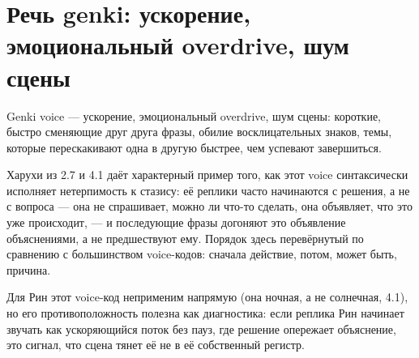 \section{Речь genki: ускорение, эмоциональный overdrive, шум сцены}

Genki voice — ускорение, эмоциональный overdrive, шум сцены: короткие, быстро сменяющие друг друга фразы, обилие восклицательных знаков, темы, которые перескакивают одна в другую быстрее, чем успевают завершиться.

Харухи из 2.7 и 4.1 даёт характерный пример того, как этот voice синтаксически исполняет нетерпимость к стазису: её реплики часто начинаются с решения, а не с вопроса — она не спрашивает, можно ли что-то сделать, она объявляет, что это уже происходит, — и последующие фразы догоняют это объявление объяснениями, а не предшествуют ему. Порядок здесь перевёрнутый по сравнению с большинством voice-кодов: сначала действие, потом, может быть, причина.

Для Рин этот voice-код неприменим напрямую (она ночная, а не солнечная, 4.1), но его противоположность полезна как диагностика: если реплика Рин начинает звучать как ускоряющийся поток без пауз, где решение опережает объяснение, это сигнал, что сцена тянет её не в её собственный регистр.
